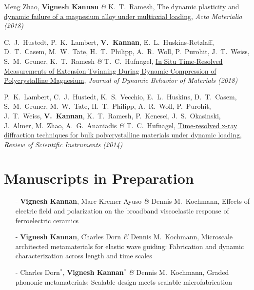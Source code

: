 \documentclass[a4paper,10pt, oneside]{article}
\begin{document}
\begin{enumerate}[label={[\arabic*]}, leftmargin=*]
		\item Meng Zhao, \textbf{Vignesh Kannan} \emph{\&} K.~T.~Ramesh, \href{https://www.sciencedirect.com/science/article/pii/S1359645418303641}{The dynamic plasticity and dynamic failure of a magnesium alloy under multiaxial loading}, \textit{Acta Materialia (2018)} \label{actmat2018}
		\item C.~J.~Hustedt, P.~K.~Lambert, \textbf{V.~Kannan}, E.~L.~Huskins-Retzlaff, D.~T.~Casem, M.~W.~Tate, H.~T.~Philipp, A.~R.~Woll, P.~Purohit, J.~T.~Weiss, S.~M.~Gruner, K.~T.~Ramesh \emph{\&} T.~C.~Hufnagel, \href{https://link.springer.com/article/10.1007/s40870-018-0152-8}{In Situ Time-Resolved Measurements of Extension Twinning During Dynamic Compression of Polycrystalline Magnesium}, \textit{Journal of Dynamic Behavior of Materials (2018)} \label{jdbm2018}
		\item P.~K.~Lambert, C.~J.~Hustedt, K.~S.~Vecchio, E.~L.~Huskins, D.~T.~Casem, S.~M.~Gruner, M.~W.~Tate, H.~T.~Philipp, A.~R.~Woll, P.~Purohit, J.~T.~Weiss, \textbf{V.~Kannan}, K.~T.~Ramesh, P.~Kenesei, J.~S.~Okasinski, J.~Almer, M.~Zhao, A.~G.~Ananiadis \emph{\&} T.~C.~Hufnagel, \href{https://aip.scitation.org/doi/full/10.1063/1.4893881}{Time-resolved x-ray diffraction techniques for bulk polycrystalline materials under dynamic loading}, \textit{Review of Scientific Instruments (2014)} \label{rsi2014}
	\end{enumerate}
	
	\section*{{Manuscripts in Preparation}}
	\begin{itemize}[wide, labelwidth=!, labelindent=0em]
		\itemsep0em
		\item[-] \textbf{Vignesh Kannan}, Marc Kremer Ayuso \emph{\&} Dennis M.~Kochmann, Effects of electric field and polarization on the broadband viscoelastic response of ferroelectric ceramics \label{ferrovisco1}
		\item[-] \textbf{Vignesh Kannan}, Charles Dorn \emph{\&} Dennis M.~Kochmann, Microscale architected metamaterials for elastic wave guiding: Fabrication and dynamic characterization across length and time scales \label{waferwavesmethods}
		\item[-] Charles Dorn$^{*}$, \textbf{Vignesh Kannan}$^{*}$ \emph{\&} Dennis M.~Kochmann, Graded phononic metamaterials: Scalable design meets scalable microfabrication \label{waferwavesdesign}
	\end{itemize}
\end{document}
